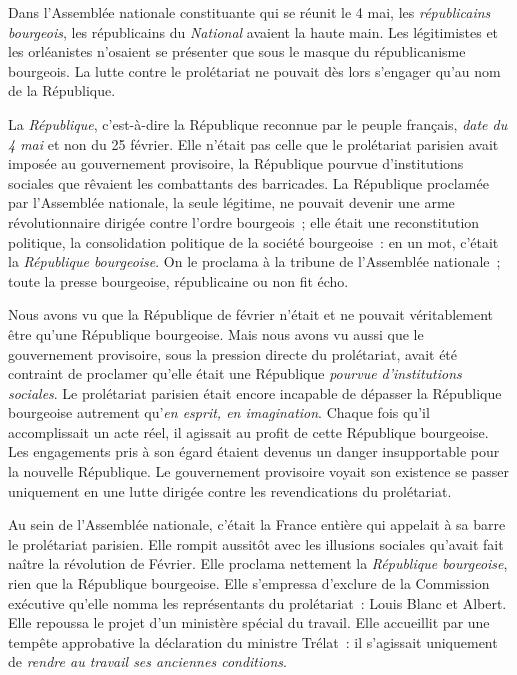 \documentclass[twoside]{book} %
\begin{document}
Dans l’Assemblée nationale constituante qui se réunit le 4 mai, les \emph{républicains bourgeois}, les républicains du \emph{National} avaient la haute main. Les légitimistes et les orléanistes n’osaient se présenter que sous le masque du républicanisme bourgeois. La lutte contre le prolétariat ne pouvait dès lors s’engager qu’au nom de la République.\par
La \emph{République}, c’est-à-dire la République reconnue par le peuple français, \emph{date du 4 mai} et non du 25 février. Elle n’était pas celle que le prolétariat parisien avait imposée au gouvernement provisoire, la République pourvue d’institutions sociales que rêvaient les combattants des barricades. La République proclamée par l’Assemblée nationale, la seule légitime, ne pouvait devenir une arme révolutionnaire dirigée contre l’ordre bourgeois ; elle était une reconstitution politique, la consolidation politique de la société bourgeoise : en un mot, c’était la \emph{République bourgeoise}. On le proclama à la tribune de l’Assemblée nationale ; toute la presse bourgeoise, républicaine ou non fit écho.\par
Nous avons vu que la République de février n’était et ne pouvait véritablement être qu’une République bourgeoise. Mais nous avons vu aussi que le gouvernement provisoire, sous la pression directe du prolétariat, avait été contraint de proclamer qu’elle était une République \emph{pourvue d’institutions sociales}. Le prolétariat parisien était encore incapable de dépasser la République bourgeoise autrement qu’\emph{en esprit, en imagination}. Chaque fois qu’il accomplissait un acte réel, il agissait au profit de cette République bourgeoise. Les engagements pris à son égard étaient devenus un danger insupportable pour la nouvelle République. Le gouvernement provisoire voyait son existence se passer uniquement en une lutte dirigée contre les revendications du prolétariat.\par
Au sein de l’Assemblée nationale, c’était la France entière qui appelait à sa barre le prolétariat parisien. Elle rompit aussitôt avec les illusions sociales qu’avait fait naître la révolution de Février. Elle proclama nettement la \emph{République bourgeoise}, rien que la République bourgeoise. Elle s’empressa d’exclure de la Commission exécutive qu’elle nomma les représentants du prolétariat : Louis Blanc et Albert. Elle repoussa le projet d’un ministère spécial du travail. Elle accueillit par une tempête approbative la déclaration du ministre Trélat : il s’agissait uniquement de \emph{rendre au travail ses anciennes conditions}.\par
\end{document}
